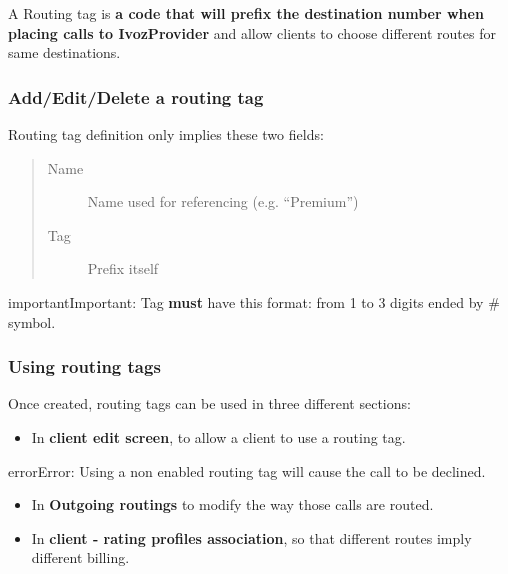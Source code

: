 \documentclass[letterpaper,10pt,english]{sphinxmanual}
\begin{document}
A Routing tag is \textbf{a code that will prefix the destination number when placing calls to IvozProvider} and allow clients
to choose different routes for same destinations.


\subsubsection{Add/Edit/Delete a routing tag}
\label{administration_portal/brand/routing/routing_tags:add-edit-delete-a-routing-tag}
Routing tag definition only implies these two fields:
\begin{quote}
\begin{description}
\item[{Name}] \leavevmode
Name used for referencing (e.g. ``Premium'')

\item[{Tag}] \leavevmode
Prefix itself

\end{description}
\end{quote}

\begin{notice}{important}{Important:}
Tag \textbf{must} have this format: from 1 to 3 digits ended by \# symbol.
\end{notice}


\subsubsection{Using routing tags}
\label{administration_portal/brand/routing/routing_tags:using-routing-tags}
Once created, routing tags can be used in three different sections:
\begin{itemize}
\item {} 
In \textbf{client edit screen}, to allow a client to use a routing tag.

\end{itemize}

\begin{notice}{error}{Error:}
Using a non enabled routing tag will cause the call to be declined.
\end{notice}
\begin{itemize}
\item {} 
In \textbf{Outgoing routings} to modify the way those calls are routed.

\item {} 
In \textbf{client - rating profiles association}, so that different routes imply different billing.

\end{itemize}
\end{document}
